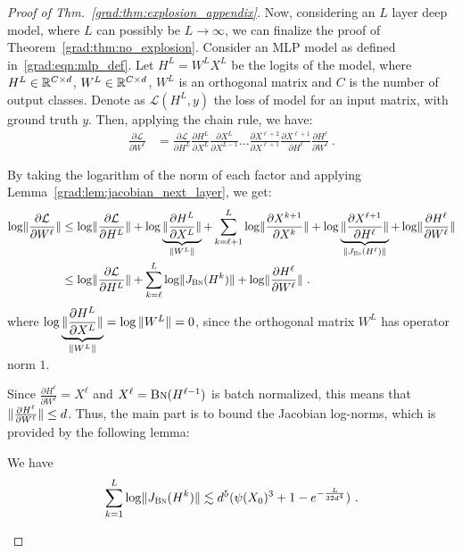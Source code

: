 \begin{proof}[Proof of Thm.~\ref{grad:thm:explosion_appendix}]
Now, considering an $L$ layer deep model, where $L$ can possibly be $L \to \infty$, we can finalize the proof of Theorem~\ref{grad:thm:no_explosion}. Consider an MLP model as defined in~\eqref{grad:eqn:mlp_def}. Let $H^L = W^L X^{L}$ be the logits of the model, where $H^L\in \mathbb{R}^{C \times d}$, $W^L \in \mathbb{R}^{C \times d}$, $W^L$ is an orthogonal matrix and $C$ is the number of output classes. Denote as $\mathcal{L} (H^L, y)$ the loss of model for an input matrix, with ground truth $y$. Then, applying the chain rule, we have:
\begin{align}
    \frac{\partial \mathcal{L}}{\partial W^\ell} 
    &= \frac{\partial \mathcal{L}}{\partial H^L} \frac{\partial H^L}{\partial X^L} \frac{\partial X^{L}}{\partial X^{L-1}} \dots \frac{\partial X^{\ell + 2}}{\partial X^{\ell + 1}} \frac{\partial X^{\ell+1}}{\partial H^\ell} \frac{\partial H^\ell}{\partial W^\ell}~.
\end{align}

By taking the logarithm of the norm of each factor and applying Lemma~\ref{grad:lem:jacobian_next_layer}, we get:
\begin{align}
    \log \lVert\frac{\partial \mathcal{L}}{\partial W^\ell}\rVert 
    &\leq \log \lVert\frac{\partial \mathcal{L}}{\partial H^L}\rVert + \log \underbrace{\lVert\frac{\partial H^L}{\partial X^L}\rVert}_{\lVert W^L\rVert} + \sum_{k = \ell+1}^L \log \lVert\frac{\partial X^{k+1}}{\partial X^k}\rVert + \log \underbrace{\lVert\frac{\partial X^{\ell+1}}{\partial H^\ell}\rVert}_{\lVert J_{\text{\sc{Bn}}}(H^\ell)\rVert} + \log\lVert\frac{\partial H^\ell}{\partial W^\ell}\rVert \\
    &\leq \log \lVert\frac{\partial \mathcal{L}}{\partial H^L}\rVert + \sum_{k = \ell}^L \log \lVert J_{\text{\sc{Bn}}}(H^k)\rVert + \log\lVert\frac{\partial H^\ell}{\partial W^\ell}\rVert~. \label{grad:eqn:loss_grad_proof}
\end{align}
where $\log \underbrace{\lVert\frac{\partial H^L}{\partial X^L}\rVert}_{\lVert W^L\rVert} = \log{\lVert W^L\rVert} = 0$, since the orthogonal matrix $W^L$ has operator norm $1$.

Since $\frac{\partial H^\ell}{\partial W^\ell} = X^{\ell}$ and $X^\ell = \text{\sc{Bn}}(H^{\ell-1})$ is batch normalized, this means that $\lVert\frac{\partial H^\ell}{\partial W^\ell}\rVert \leq d$. 
Thus, the main part is to bound the Jacobian log-norms, which is provided by the following lemma:

\begin{lemma}\label{grad:lem:jacobian_log_norm_bound}
We have 
\begin{align}
    \sum_{k = 1}^L \log \lVert J_{\text{\sc{Bn}}}(H^k)\rVert\lesssim d^5 (\psi(X_0)^3 + 1- e^{-\frac{L}{32 d^4}})~.
\end{align}


\end{lemma}
\end{proof}
